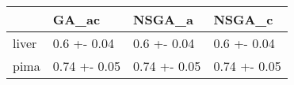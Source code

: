 \begin{tabular}{llll}
\toprule
{} &         GA\_ac &        NSGA\_a &        NSGA\_c \\
\midrule
liver &   0.6 +- 0.04 &   0.6 +- 0.04 &   0.6 +- 0.04 \\
pima  &  0.74 +- 0.05 &  0.74 +- 0.05 &  0.74 +- 0.05 \\
\bottomrule
\end{tabular}
